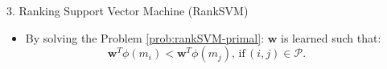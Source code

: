 \documentclass{beamer}
\newcommand{\VEC}[1]{\mathbf{#1}}
\newcommand{\mol}{m}
\newcommand{\Pref}{\mathcal{P}}
\begin{document}
\begin{frame}{}
\begin{columns}[T]
\begin{column}{.48\linewidth}
\begin{block}       {{\normalsize 3. Ranking Support Vector Machine (RankSVM)}}
\begin{itemize}
\begin{align}
                         &\quad \xi_{ij} \geq 0, \forall(i,j)\in  \Pref,
\end{align}                    
                    with $C>0$ being a regularization parameter. 
                    \item By solving the Problem \eqref{prob:rankSVM-primal}: $\VEC{w}$ is learned such that:
\begin{equation}
                    \VEC{w}^T\phi(\mol_i)<\VEC{w}^T\phi(\mol_j),\,\text{if}\,(i,j)\in  \Pref.\label{eq:prediction_model_RankSVM}
\end{equation}
\end{itemize}
\end{block}

\end{column}

\begin{column}{.52\linewidth}


\end{column}
\end{columns}
\end{frame}
\end{document}
